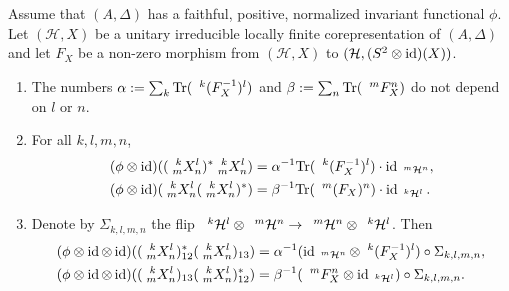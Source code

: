 \begin{Theorem} \label{thm:rep-orthogonality} Assume that $(A,\Delta)$
  has a faithful, positive, normalized invariant functional
  $\phi$. Let $(\mathcal{H},X)$ be a unitary irreducible locally
  finite corepresentation of $(A,\Delta)$ and let $F_{X}$ be a
  non-zero morphism from $(\mathcal{H},X)$ to $(\mathcal{H},(S^{2}
  \otimes \id)(X))$.
  \begin{enumerate}
  \item The numbers $\alpha:=\sum_{k} \Tr(\Gru{(F_{X}^{-1})}{k}{l})$
    and $\beta:=\sum_{n} \Tr(\Gru{F_{X}}{m}{n})$ do not depend on $l$
    or $n$.
  \item  For all $k,l,m,n$,
    \begin{align*}
      (\phi \otimes \id)((\Gr{X}{k}{l}{m}{n})^{*}\Gr{X}{k}{l}{m}{n})
      &=\alpha^{-1}{\Tr(\Gru{(F^{-1}_{X})}{k}{l})} \cdot
      \id_{\Gru{\mathcal{H}}{m}{n}}, \\
      (\phi \otimes \id)(\Gr{X}{k}{l}{m}{n}(\Gr{X}{k}{l}{m}{n})^{*})
      &=\beta^{-1}{\Tr( \Gru{(F_{X})}{m}{n})} \cdot
      \id_{\Gru{\mathcal{H}}{k}{l}}.
    \end{align*}
  \item Denote by $\Sigma_{k,l,m,n}$ the flip $\Gru{\mathcal{H}}{k}{l}
    \otimes \Gru{\mathcal{H}}{m}{n} \to \Gru{\mathcal{H}}{m}{n}
    \otimes \Gru{\mathcal{H}}{k}{l}$. Then
 \begin{align*}
   (\phi \otimes \id \otimes
   \id)((\Gr{X}{k}{l}{m}{n})_{12}^{*}(\Gr{X}{k}{l}{m}{n})_{13}) &=
   \alpha^{-1}
   (\id_{\Gru{\mathcal{H}}{m}{n}} \otimes \Gru{(F_{X}^{-1})}{k}{l})
   \circ \Sigma_{k,l,m,n}, \\
   (\phi \otimes \id \otimes
   \id)((\Gr{X}{k}{l}{m}{n})_{13}(\Gr{X}{k}{l}{m}{n})_{12}^{*}) &= \beta^{-1} (\Gru{F_{X}}{m}{n}
   \otimes \id_{\Gru{\mathcal{H}}{k}{l}}) \circ \Sigma_{k,l,m,n}.
 \end{align*}
\end{enumerate}
  \end{Theorem}
